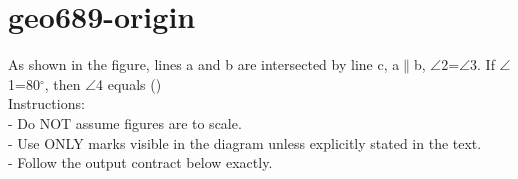 \documentclass[12pt]{article}
\begin{document}
\section*{geo689-origin}
\noindent\begin{minipage}{\textwidth}
\setlength{\parskip}{4pt}
As shown in the figure, lines a and b are intersected by line c, a\ensuremath{\parallel }b, \ensuremath{\angle }2=\ensuremath{\angle }3. If \ensuremath{\angle }1=80\ensuremath{^\circ}, then \ensuremath{\angle }4 equals ()\\
Instructions:\\
- Do NOT assume figures are to scale.\\
- Use ONLY marks visible in the diagram unless explicitly stated in the text.\\
- Follow the output contract below exactly.\\
\end{minipage}
\end{document}
